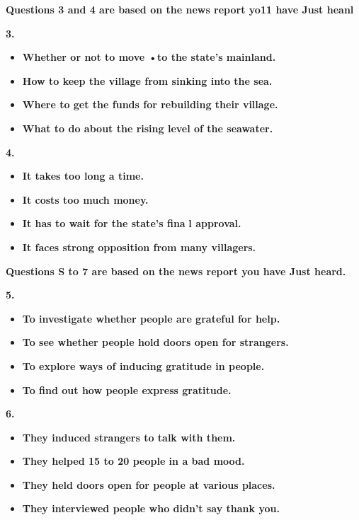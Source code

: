 \documentclass[UTF8,11pt]{ctexart}
\begin{document}
\textbf{Questions 3 and 4 are based on the news report yo11 have Just heanl}


\textbf{3.}


\begin{itemize}[leftmargin=2em,itemsep=.2em,topsep=.4em]\item[A.] \textbf{Whether or not to move •to the state's mainland.}
\item[B.] \textbf{How to keep the village from sinking into the sea.}
\item[C.] \textbf{Where to get the funds for rebuilding their village.}
\item[D.] \textbf{What to do about the rising level of the seawater.}
\end{itemize}

\textbf{4.}


\begin{itemize}[leftmargin=2em,itemsep=.2em,topsep=.4em]\item[A.] \textbf{It takes too long a time.}
\item[B.] \textbf{It costs too much money.}
\item[C.] \textbf{It has to wait for the state's fina} \textbf{l approval.}
\item[D.] \textbf{It faces strong opposition from many villagers.}
\end{itemize}

\textbf{Questions S to 7 are based on the news report you have Just heard.}


\textbf{5.}


\begin{itemize}[leftmargin=2em,itemsep=.2em,topsep=.4em]\item[A.] \textbf{To investigate whether people are grateful for help.}
\item[B.] \textbf{To see whether people hold doors open for strangers.}
\item[C.] \textbf{To explore ways of inducing gratitude in people.}
\item[D.] \textbf{To find out how people express gratitude.}
\end{itemize}

\textbf{6.}


\begin{itemize}[leftmargin=2em,itemsep=.2em,topsep=.4em]\item[A.] \textbf{They induced strangers to talk with them.}
\item[B.] \textbf{They helped 15 to 20 people in a bad mood.}
\item[C.] \textbf{They held doors open for people at various places.}
\item[D.] \textbf{They interviewed people who didn't say thank you.}
\end{itemize}
\end{document}

